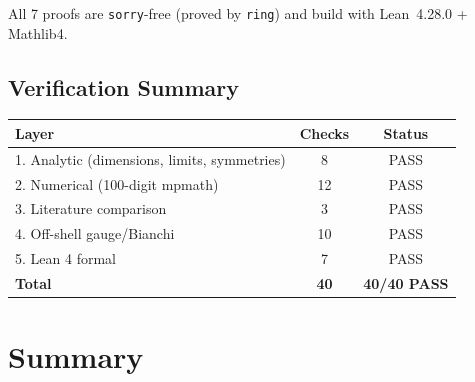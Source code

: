 \documentclass[11pt,a4paper]{article}
\theoremstyle{plain}
\theoremstyle{definition}
\begin{document}
All 7 proofs are \texttt{sorry}-free (proved by \texttt{ring}) and
build with Lean~4.28.0 + Mathlib4.

\subsection{Verification Summary}

\begin{center}
\begin{tabular}{lcc}
\toprule
Layer & Checks & Status \\
\midrule
1. Analytic (dimensions, limits, symmetries) & 8 & PASS \\
2. Numerical (100-digit mpmath) & 12 & PASS \\
3. Literature comparison & 3 & PASS \\
4. Off-shell gauge/Bianchi & 10 & PASS \\
5. Lean 4 formal & 7 & PASS \\
\midrule
\textbf{Total} & \textbf{40} & \textbf{40/40 PASS} \\
\bottomrule
\end{tabular}
\end{center}

\section{Summary}\label{sec:summary}
\end{document}
